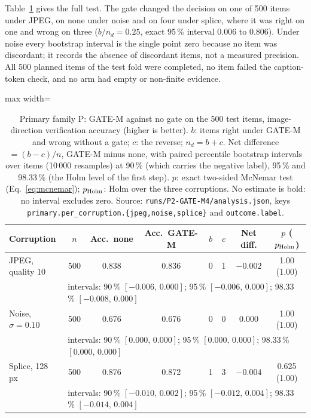 Table~\ref{tab:res_primary} gives the full test.
The gate changed the decision on one of 500 items under JPEG, on none under noise and on four under splice, where it was right on one
and wrong on three ($b/n_d=0.25$, exact 95\,\% interval 0.006 to 0.806).
Under noise every bootstrap interval is the single point zero because no item was discordant; it records the absence of discordant
items, not a measured precision.
All 500 planned items of the test fold were completed, no item failed the caption-token check, and no arm had empty or non-finite
evidence.

\begin{table}[!tbp]
\centering
\caption{Primary family P: GATE-M against no gate on the 500 test items, image-direction verification accuracy (higher is better).
$b$: items right under GATE-M and wrong without a gate; $c$: the reverse; $n_d=b+c$.
Net difference $=(b-c)/n$, GATE-M minus none, with paired percentile bootstrap intervals over items (10\,000 resamples) at 90\,\%
(which carries the negative label), 95\,\% and 98.33\,\% (the Holm level of the first step).
$p$: exact two-sided McNemar test (Eq.~\eqref{eq:mcnemar}); $p_{\rm Holm}$: Holm over the three corruptions.
No estimate is bold: no interval excludes zero.
Source: \nolinkurl{runs/P2-GATE-M4/analysis.json}, keys \nolinkurl{primary.per_corruption.{jpeg,noise,splice}} and
\nolinkurl{outcome.label}.}
\label{tab:res_primary}
\footnotesize
\begin{adjustbox}{max width=\textwidth}
\begin{tabular}{lccccccc}
\toprule
Corruption & $n$ & Acc.\ none & Acc.\ GATE-M & $b$ & $c$ & Net diff. & $p$ ($p_{\rm Holm}$) \\
\midrule
JPEG, quality 10 & 500 & 0.838 & 0.836 & 0 & 1 & $-0.002$ & 1.00 (1.00) \\
& \multicolumn{7}{l}{\scriptsize intervals: 90\,\% $[-0.006,\,0.000]$; 95\,\% $[-0.006,\,0.000]$; 98.33\,\% $[-0.008,\,0.000]$} \\
Noise, $\sigma=0.10$ & 500 & 0.676 & 0.676 & 0 & 0 & $0.000$ & 1.00 (1.00) \\
& \multicolumn{7}{l}{\scriptsize intervals: 90\,\% $[0.000,\,0.000]$; 95\,\% $[0.000,\,0.000]$; 98.33\,\% $[0.000,\,0.000]$} \\
Splice, 128 px & 500 & 0.876 & 0.872 & 1 & 3 & $-0.004$ & 0.625 (1.00) \\
& \multicolumn{7}{l}{\scriptsize intervals: 90\,\% $[-0.010,\,0.002]$; 95\,\% $[-0.012,\,0.004]$; 98.33\,\% $[-0.014,\,0.004]$} \\
\bottomrule
\end{tabular}
\end{adjustbox}
\end{table}

